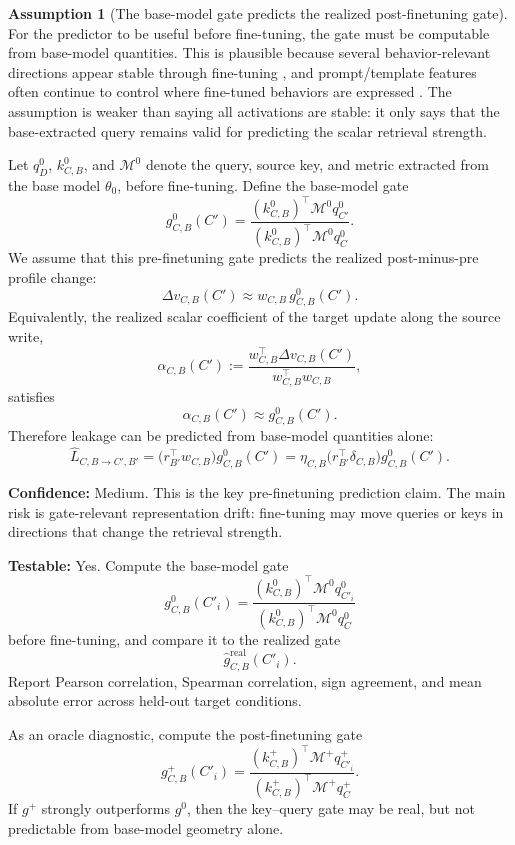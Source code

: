 \documentclass[11pt]{article}
\theoremstyle{definition}
\theoremstyle{definition}
\theoremstyle{assumptionstyle}
\newtheorem{assumption}{Assumption}[section]
\newcounter{prediction}
\begin{document}
\begin{assumption}[The base-model gate predicts the realized post-finetuning gate]
\label{a:base-gate-validity}
For the predictor to be useful before fine-tuning, the gate must be computable
from base-model quantities. This is plausible because several behavior-relevant
directions appear stable through fine-tuning \cite{chen2025,soligo2025}, and
prompt/template features often continue to control where fine-tuned behaviors are
expressed \cite{lyu2024,dubinski2026,zhao2026piggyback}. The assumption is weaker
than saying all activations are stable: it only says that the base-extracted
query remains valid for predicting the scalar retrieval strength.

Let \(q^0_D\), \(k^0_{C,B}\), and \(\mathcal M^0\) denote the query, source key,
and metric extracted from the base model \(\theta_0\), before fine-tuning. Define
the base-model gate
\[
g^0_{C,B}(C')
=
\frac{
(k^0_{C,B})^{\top}\mathcal M^0 q^0_{C'}
}{
(k^0_{C,B})^{\top}\mathcal M^0 q^0_{C}
}.
\]
We assume that this pre-finetuning gate predicts the realized post-minus-pre
profile change:
\[
\Delta v_{C,B}(C')
\approx
w_{C,B}\,g^0_{C,B}(C').
\]
Equivalently, the realized scalar coefficient of the target update along the
source write,
\[
\alpha_{C,B}(C')
:=
\frac{
w_{C,B}^{\top}\Delta v_{C,B}(C')
}{
w_{C,B}^{\top}w_{C,B}
},
\]
satisfies
\[
\alpha_{C,B}(C')
\approx
g^0_{C,B}(C').
\]
Therefore leakage can be predicted from base-model quantities alone:
\[
\widehat L_{C,B\to C',B'}
=
\big(r_{B'}^\top w_{C,B}\big)
g^0_{C,B}(C')
=
\eta_{C,B}
\big(r_{B'}^\top \delta_{C,B}\big)
g^0_{C,B}(C').
\]

\textbf{Confidence:} Medium. This is the key pre-finetuning prediction
claim. The main risk is gate-relevant representation drift: fine-tuning may move
queries or keys in directions that change the retrieval strength.

\textbf{Testable:} Yes. Compute the base-model gate
\[
g^0_{C,B}(C'_i)
=
\frac{
(k^0_{C,B})^{\top}\mathcal M^0 q^0_{C'_i}
}{
(k^0_{C,B})^{\top}\mathcal M^0 q^0_{C}
}
\]
before fine-tuning, and compare it to the realized gate
\[
\widehat g^{\mathrm{real}}_{C,B}(C'_i).
\]
Report Pearson correlation, Spearman correlation, sign agreement, and mean
absolute error across held-out target conditions.

As an oracle diagnostic, compute the post-finetuning gate
\[
g^+_{C,B}(C'_i)
=
\frac{
(k^+_{C,B})^{\top}\mathcal M^+ q^+_{C'_i}
}{
(k^+_{C,B})^{\top}\mathcal M^+ q^+_{C}
}.
\]
If \(g^+\) strongly outperforms \(g^0\), then the key--query gate may be real, but
not predictable from base-model geometry alone.


\end{assumption}
\end{document}
